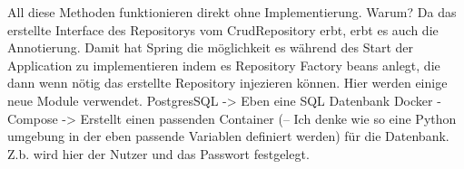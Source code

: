         All diese Methoden funktionieren direkt ohne Implementierung.
        Warum? Da das erstellte Interface des Repositorys vom
        CrudRepository erbt, erbt es auch die Annotierung. Damit hat
        Spring die möglichkeit es während des Start der Application zu
        implementieren indem es Repository Factory beans anlegt, die
        dann wenn nötig das erstellte Repository injezieren können.
        Hier werden einige neue Module verwendet. 
        PostgresSQL -> Eben eine SQL Datenbank
        Docker - Compose -> Erstellt einen passenden Container (-- Ich
        denke wie so eine Python umgebung in der eben passende
        Variablen definiert werden) für die
        Datenbank. Z.b. wird hier der Nutzer und das Passwort
        festgelegt.
